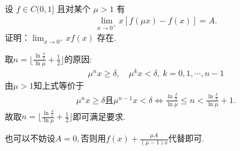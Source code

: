 \documentclass[../../main.tex]{subfiles}
\begin{document}
\begin{example}
设 $f \in C(0,1]$ 且对某个 $\mu > 1$ 有
\begin{align*}
\lim_{x \to 0^+} x[f(\mu x) - f(x)] = A.
\end{align*}
证明：$\lim_{x \to 0^+} x f(x)$ 存在.
\end{example}
\begin{note}
取$n=\lfloor \frac{\ln \frac{\delta}{x}}{\ln \mu} + \frac{1}{2} \rfloor$的原因:
\begin{align*}
\mu^n x \geqslant \delta, \quad \mu^k x < \delta, \ k=0,1,\cdots,n-1
\end{align*}
由$\mu > 1$知上式等价于
\begin{align*}
\mu^n x \geqslant  \delta \text{且}\mu^{n-1} x <\delta \Longleftrightarrow \frac{\ln \frac{\delta}{x}}{\ln \mu} \leqslant n < \frac{\ln \frac{\delta}{x}}{\ln \mu} + 1.
\end{align*}
故取$n=\lfloor \frac{\ln \frac{\delta}{x}}{\ln \mu} + \frac{1}{2} \rfloor$即可满足要求.
\end{note}
\begin{remark}
也可以不妨设$A=0,$否则用$f(x)+\frac{\mu A}{(\mu - 1)x}$代替即可.
\end{remark}
\end{document}
